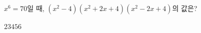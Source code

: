 $x^6=70$일 때, $(x^2-4)(x^2+2x+4)(x^2-2x+4)$의 값은?
\begin{choices32}{$2$}{$3$}{$4$}{$5$}{$6$}\end{choices32}
